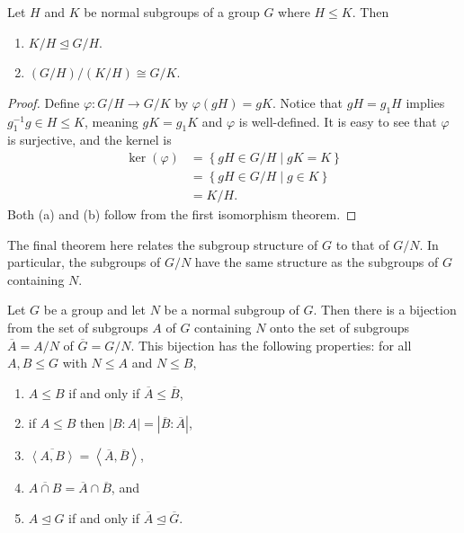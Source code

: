 \documentclass[../m171main.tex]{subfiles}
\begin{document}
\begin{theorem}
    Let $H$ and $K$ be normal subgroups of a group $G$ where $H \leq K$.
    Then
    \begin{enumerate}[label=(\alph*)]
        \item $K / H \trianglelefteq G / H$.
        \item $(G / H) / (K / H) \cong G / K$.
    \end{enumerate}
\end{theorem}

\begin{proof}
    Define $\varphi : G / H \to G / K$ by $\varphi(gH) = gK$.
    Notice that $gH = g_1H$ implies $g_1^{-1} g \in H \leq K$, meaning $gK = g_1 K$ and $\varphi$ is well-defined.
    It is easy to see that $\varphi$ is surjective, and the kernel is
    \begin{align*}
        \ker(\varphi) &= \left\{ gH \in G / H \mid gK = K \right\} \\
        &= \left\{ gH \in G / H \mid g \in K \right\} \\
        &= K / H.
    \end{align*}
    Both (a) and (b) follow from the first isomorphism theorem.
\end{proof}

The final theorem here relates the subgroup structure of $G$ to that of $G / N$.
In particular, the subgroups of $G / N$ have the same structure as the subgroups of $G$ containing $N$.

\begin{theorem}
    Let $G$ be a group and let $N$ be a normal subgroup of $G$.
    Then there is a bijection from the set of subgroups $A$ of $G$ containing $N$ onto the set of subgroups $\overline A = A / N$ of $\overline G = G / N$.
    This bijection has the following properties: for all $A,B \leq G$ with $N \leq A$ and $N \leq B$,
    \begin{enumerate}[label=(\alph*),topsep=0pt]
        \item $A \leq B$ if and only if $\overline A \leq \overline B$,
        \item if $A \leq B$ then $|B : A| = |\overline B : \overline A|$,
        \item $\overline{\left< A,B \right>} = \left< \overline A, \overline B \right>$,
        \item $\overline{A \cap B} = \overline A \cap \overline B$, and
        \item $A \trianglelefteq G$ if and only if $\overline A \trianglelefteq \overline G$.
    \end{enumerate}
\end{theorem}

\end{document}
